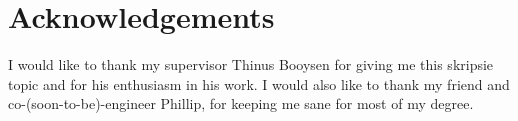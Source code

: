 \chapter*{Acknowledgements}
\makeatletter{}\makeatother


I would like to thank my supervisor Thinus Booysen for giving me this skripsie topic and for his enthusiasm in his work. I would also like to thank my friend and\\ co-(soon-to-be)-engineer Phillip, for keeping me sane for most of my degree.